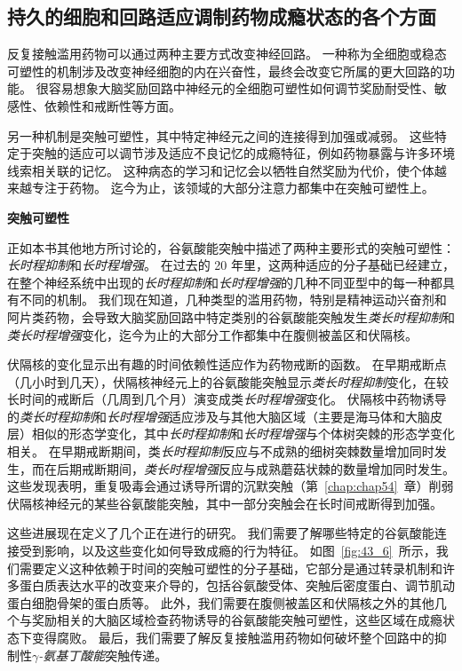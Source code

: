 \subsection{持久的细胞和回路适应调制药物成瘾状态的各个方面}

反复接触滥用药物可以通过两种主要方式改变神经回路。
一种称为全细胞或稳态可塑性的机制涉及改变神经细胞的内在兴奋性，最终会改变它所属的更大回路的功能。
很容易想象大脑奖励回路中神经元的全细胞可塑性如何调节奖励耐受性、敏感性、依赖性和戒断性等方面。


另一种机制是突触可塑性，其中特定神经元之间的连接得到加强或减弱。
这些特定于突触的适应可以调节涉及适应不良记忆的成瘾特征，例如药物暴露与许多环境线索相关联的记忆。
这种病态的学习和记忆会以牺牲自然奖励为代价，使个体越来越专注于药物。
迄今为止，该领域的大部分注意力都集中在突触可塑性上。


\textbf{突触可塑性}

正如本书其他地方所讨论的，谷氨酸能突触中描述了两种主要形式的突触可塑性：
\textit{长时程抑制}和\textit{长时程增强}。
在过去的 20 年里，这两种适应的分子基础已经建立，在整个神经系统中出现的\textit{长时程抑制}和\textit{长时程增强}的几种不同亚型中的每一种都具有不同的机制。
我们现在知道，几种类型的滥用药物，特别是精神运动兴奋剂和阿片类药物，会导致大脑奖励回路中特定类别的谷氨酸能突触发生\textit{类长时程抑制}和\textit{类长时程增强}变化，迄今为止的大部分工作都集中在腹侧被盖区和伏隔核。


伏隔核的变化显示出有趣的时间依赖性适应作为药物戒断的函数。
在早期戒断点（几小时到几天），伏隔核神经元上的谷氨酸能突触显示\textit{类长时程抑制}变化，在较长时间的戒断后（几周到几个月）演变成类\textit{长时程增强}变化。
伏隔核中药物诱导的\textit{类长时程抑制}和\textit{长时程增强}适应涉及与其他大脑区域（主要是海马体和大脑皮层）相似的形态学变化，其中\textit{长时程抑制}和\textit{长时程增强}与个体树突棘的形态学变化相关。
在早期戒断期间，类\textit{长时程抑制}反应与不成熟的细树突棘数量增加同时发生，而在后期戒断期间，\textit{类长时程增强}反应与成熟蘑菇状棘的数量增加同时发生。
这些发现表明，重复吸毒会通过诱导所谓的沉默突触（第~\ref{chap:chap54}~章）削弱伏隔核神经元的某些谷氨酸能突触，其中一部分突触会在长时间戒断得到加强。


这些进展现在定义了几个正在进行的研究。
我们需要了解哪些特定的谷氨酸能连接受到影响，以及这些变化如何导致成瘾的行为特征。
如图~\ref{fig:43_6}~所示，我们需要定义这种依赖于时间的突触可塑性的分子基础，它部分是通过转录机制和许多蛋白质表达水平的改变来介导的，包括谷氨酸受体、突触后密度蛋白、调节肌动蛋白细胞骨架的蛋白质等。
此外，我们需要在腹侧被盖区和伏隔核之外的其他几个与奖励相关的大脑区域检查药物诱导的谷氨酸能突触可塑性，这些区域在成瘾状态下变得腐败。
最后，我们需要了解反复接触滥用药物如何破坏整个回路中的抑制性\textit{$\gamma$-氨基丁酸能}突触传递。


